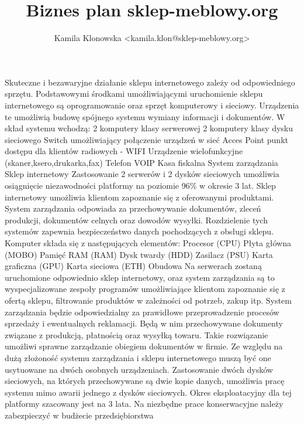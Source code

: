 \documentclass[
12pt, %
a4paper
]{report}
\title{Biznes plan sklep-meblowy.org}
\author{Kamila Klonowska <kamila.klon@sklep-meblowy.org>}
\newcommand\blankpage{%
    \null
	\ClearWallPaper
    \thispagestyle{empty}%
    \addtocounter{page}{-1}%
    \newpage
	\ULCornerWallPaper{1}{head}}
\begin{document}
			


	

	\afterpage{\blankpage}
	
	
	
Skuteczne i bezawaryjne działanie sklepu internetowego zależy od odpowiedniego sprzętu. Podstawowymi środkami umożliwiającymi uruchomienie sklepu internetowego są oprogramowanie oraz sprzęt komputerowy i sieciowy. Urządzenia te umożliwią budowę spójnego systemu wymiany informacji i dokumentów. W skład systemu wchodzą:
2 komputery klasy serwerowej
2 komputery klasy dysku sieciowego
Switch umożliwiający połączenie urządzeń w sieć
Acces Point punkt dostępu dla klientów radiowych - WIFI 
Urządzenie wielofunkcyjne (skaner,ksero,drukarka,fax)
Telefon VOIP 
Kasa fiskalna
System zarządzania
Sklep internetowy
Zastosowanie 2 serwerów i 2 dysków sieciowych umożliwia osiągnięcie niezawodności platformy na poziomie 96\% w okresie 3 lat. Sklep internetowy umożliwia klientom zapoznanie się z oferowanymi produktami. System zarządzania odpowiada za przechowywanie dokumentów, zleceń produkcji, dokumentów celnych oraz dowodów wysyłki. Rozdzielenie tych systemów zapewnia bezpieczeństwo danych pochodzących z obsługi sklepu. 
Komputer składa się z następujących elementów:
Procesor (CPU)
Płyta główna (MOBO)
Pamięć RAM (RAM)
Dysk twardy (HDD)
Zasilacz (PSU)
Karta graficzna (GPU)
Karta sieciowa (ETH)
Obudowa 
Na serwerach zostaną uruchomione odpowiednio sklep internetowy, oraz system zarządzania są to wyspecjalizowane zespoły programów umożliwiające klientom zapoznanie się z ofertą sklepu, filtrowanie produktów w zależności od potrzeb, zakup itp. System zarządzania będzie odpowiedzialny za prawidłowe przeprowadzenie procesów sprzedaży i ewentualnych reklamacji. 
Będą w nim przechowywane dokumenty związane z produkcją, płatnością oraz wysyłką towaru. Takie rozwiązanie umożliwi sprawne zarządzanie obiegiem dokumentów w firmie. Ze względu na dużą złożoność systemu zarządzania i sklepu internetowego muszą być one usytuowane na dwóch osobnych urządzeniach. Zastosowanie dwóch dysków sieciowych, na których przechowywane są dwie kopie danych, umożliwia pracę systemu mimo awarii jednego z dysków sieciowych. Okres eksploatacyjny dla tej platformy szacowany jest na 3 lata. Na niezbędne prace konserwacyjne należy zabezpieczyć w budżecie przedsiębiorstwa 
\end{document}
